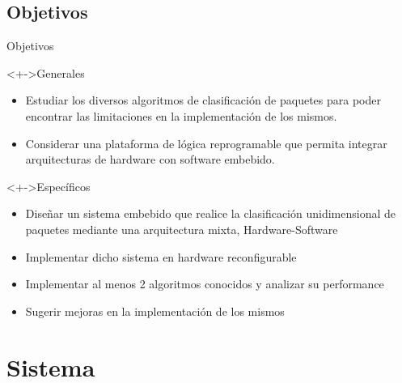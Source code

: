 \documentclass[xcolor=dvipsnames]{beamer}
\begin{document}
\subsection{Objetivos}
\begin{frame}{Objetivos}
\begin{block}<+->{Generales}   
    \begin{itemize}
      \scriptsize
      \item Estudiar los diversos algoritmos de clasificación de paquetes para poder encontrar las limitaciones en la implementación de los mismos.
      \item Considerar una plataforma de lógica reprogramable que permita integrar arquitecturas de hardware con software embebido.
    \end{itemize}
  \end{block}
  
\begin{block}<+->{Específicos}   
    \begin{itemize}
      \scriptsize
     	\item Diseñar un sistema embebido que realice la clasificación unidimensional de paquetes mediante una arquitectura mixta, Hardware-Software
	\item Implementar dicho sistema en hardware reconfigurable
	\item Implementar al menos 2 algoritmos conocidos y analizar su performance
	\item Sugerir mejoras en la implementación de los mismos   
    \end{itemize}
  \end{block}
\end{frame}

\section{Sistema}
\end{document}
